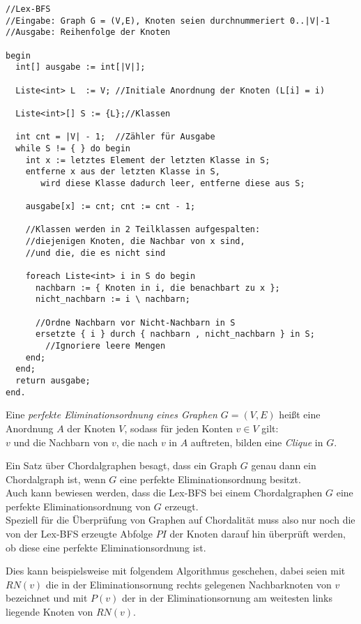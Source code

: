 \lstset{language=[Sharp]C}
\begin{lstlisting}
//Lex-BFS
//Eingabe: Graph G = (V,E), Knoten seien durchnummeriert 0..|V|-1
//Ausgabe: Reihenfolge der Knoten

begin
  int[] ausgabe := int[|V|];
  
  Liste<int> L	:= V; //Initiale Anordnung der Knoten (L[i] = i)
  
  Liste<int>[] S := {L};//Klassen
    
  int cnt = |V| - 1;  //Zähler für Ausgabe
  while S != { } do begin
    int x := letztes Element der letzten Klasse in S;
    entferne x aus der letzten Klasse in S,
       wird diese Klasse dadurch leer, entferne diese aus S;
  	
    ausgabe[x] := cnt; cnt := cnt - 1;
    
    //Klassen werden in 2 Teilklassen aufgespalten:
    //diejenigen Knoten, die Nachbar von x sind, 
    //und die, die es nicht sind
 
    foreach Liste<int> i in S do begin
      nachbarn := { Knoten in i, die benachbart zu x };
      nicht_nachbarn := i \ nachbarn;
    	
      //Ordne Nachbarn vor Nicht-Nachbarn in S    
      ersetzte { i } durch { nachbarn , nicht_nachbarn } in S;
   	    //Ignoriere leere Mengen
    end;
  end;
  return ausgabe;
end.
\end{lstlisting}

Eine \emph{perfekte Eliminationsordnung eines Graphen $G = (V,E)$} heißt eine Anordnung $A$ der Knoten $V$, sodass für jeden Konten $v \in V$ gilt:\\
$v$ und die Nachbarn von $v$, die nach $v$ in $A$ auftreten, bilden eine \emph{Clique} in $G$.

Ein Satz über Chordalgraphen besagt, dass ein Graph $G$ genau dann ein Chordalgraph ist, wenn $G$ eine perfekte Eliminationsordnung besitzt.\\
Auch kann bewiesen werden, dass die Lex-BFS bei einem Chordalgraphen $G$ eine perfekte Eliminationsordnung von $G$ erzeugt.\\
Speziell für die Überprüfung von Graphen auf Chordalität muss also nur noch die von der Lex-BFS erzeugte Abfolge $PI$ der Knoten darauf hin überprüft werden, ob diese eine perfekte Eliminationsordnung ist.

Dies kann beispielsweise mit folgendem Algorithmus geschehen, dabei seien mit $RN(v)$ die in der Eliminationsornung rechts gelegenen Nachbarknoten von $v$ bezeichnet und mit $P(v)$ der in der Eliminationsornung am weitesten links liegende Knoten von $RN(v)$.

